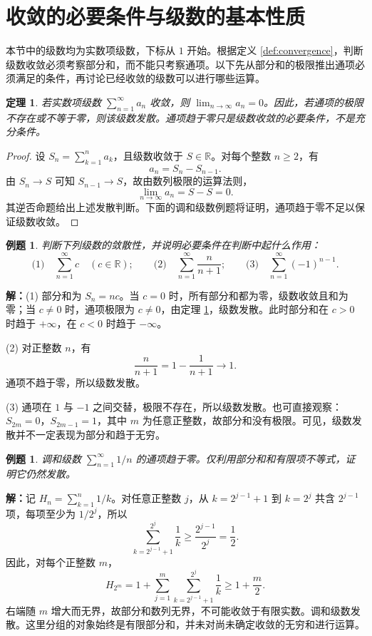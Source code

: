 \documentclass[UTF8,fontset=fandol,11pt]{ctexart}
\newtheorem{theorem}[definition]{定理}
\newtheorem{example}[definition]{例题}
\begin{document}
\section{收敛的必要条件与级数的基本性质}\label{sec:S02}
本节中的级数均为实数项级数，下标从 $1$ 开始。根据定义 \ref{def:convergence}，判断级数收敛必须考察部分和，而不能只考察通项。以下先从部分和的极限推出通项必须满足的条件，再讨论已经收敛的级数可以进行哪些运算。\par
\begin{theorem}
\label{thm:term-test}若实数项级数 $\sum_{n=1}^{\infty}a_n$ 收敛，则 $\lim_{n\to\infty}a_n=0$。因此，若通项的极限不存在或不等于零，则该级数发散。通项趋于零只是级数收敛的必要条件，不是充分条件。
\end{theorem}
\begin{proof}
设 $S_n=\sum_{k=1}^{n}a_k$，且级数收敛于 $S\in\mathbb{R}$。对每个整数 $n\geq2$，有
\[
a_n=S_n-S_{n-1}.
\]
由 $S_n\to S$ 可知 $S_{n-1}\to S$，故由数列极限的运算法则，
\[
\lim_{n\to\infty}a_n=S-S=0.
\]
其逆否命题给出上述发散判断。下面的调和级数例题将证明，通项趋于零不足以保证级数收敛。
\end{proof}
\begin{example}
判断下列级数的敛散性，并说明必要条件在判断中起什么作用：
\[
\text{(1)}\quad\sum_{n=1}^{\infty}c\quad(c\in\mathbb{R});\qquad
\text{(2)}\quad\sum_{n=1}^{\infty}\frac{n}{n+1};\qquad
\text{(3)}\quad\sum_{n=1}^{\infty}(-1)^{n-1}.
\]
\end{example}
\par\noindent\textbf{解：}(1) 部分和为 $S_n=nc$。当 $c=0$ 时，所有部分和都为零，级数收敛且和为零；当 $c\neq0$ 时，通项极限为 $c\neq0$，由定理 \ref{thm:term-test}，级数发散。此时部分和在 $c>0$ 时趋于 $+\infty$，在 $c<0$ 时趋于 $-\infty$。

(2) 对正整数 $n$，有
\[
\frac{n}{n+1}=1-\frac{1}{n+1}\longrightarrow1.
\]
通项不趋于零，所以级数发散。

(3) 通项在 $1$ 与 $-1$ 之间交替，极限不存在，所以级数发散。也可直接观察：$S_{2m}=0$，$S_{2m-1}=1$，其中 $m$ 为任意正整数，故部分和没有极限。可见，级数发散并不一定表现为部分和趋于无穷。\par
\begin{example}
调和级数 $\sum_{n=1}^{\infty}1/n$ 的通项趋于零。仅利用部分和和有限项不等式，证明它仍然发散。
\end{example}
\par\noindent\textbf{解：}记 $H_n=\sum_{k=1}^{n}1/k$。对任意正整数 $j$，从 $k=2^{j-1}+1$ 到 $k=2^j$ 共含 $2^{j-1}$ 项，每项至少为 $1/2^j$，所以
\[
\sum_{k=2^{j-1}+1}^{2^j}\frac1k\geq\frac{2^{j-1}}{2^j}=\frac12.
\]
因此，对每个正整数 $m$，
\[
H_{2^m}=1+\sum_{j=1}^{m}\sum_{k=2^{j-1}+1}^{2^j}\frac1k
\geq1+\frac m2.
\]
右端随 $m$ 增大而无界，故部分和数列无界，不可能收敛于有限实数。调和级数发散。这里分组的对象始终是有限部分和，并未对尚未确定收敛的无穷和进行运算。
\end{document}
